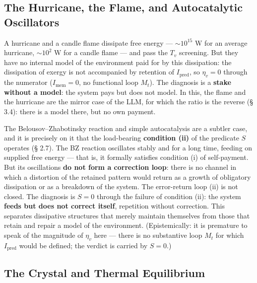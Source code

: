 \documentclass[pdflatex,sn-mathphys-ay]{sn-jnl}
\begin{document}
\subsection{The Hurricane, the Flame, and Autocatalytic Oscillators}\label{the-hurricane-the-flame-and-autocatalytic-oscillators}

A hurricane and a candle flame dissipate free energy --- \(\sim 10^{15}\) W for an average hurricane, \(\sim 10^2\) W for a candle flame --- and pass the \(T_v\) screening. But they have no internal model of the environment paid for by this dissipation: the dissipation of exergy is not accompanied by retention of \(I_{\text{pred}}\), so \(\eta_v = 0\) through the numerator (\(I_{\text{mem}} = 0\), no functional loop \(M_t\)). The diagnosis is a \textbf{stake without a model}: the system pays but does not model. In this, the flame and the hurricane are the mirror case of the LLM, for which the ratio is the reverse (§ 3.4): there is a model there, but no own payment.

The Belousov--Zhabotinsky reaction and simple autocatalysis are a subtler case, and it is precisely on it that the load-bearing \textbf{condition (ii)} of the predicate \(S\) operates (§ 2.7). The BZ reaction oscillates stably and for a long time, feeding on supplied free energy --- that is, it formally satisfies condition (i) of self-payment. But its oscillations \textbf{do not form a correction loop}: there is no channel in which a distortion of the retained pattern would return as a growth of obligatory dissipation or as a breakdown of the system. The error-return loop (ii) is not closed. The diagnosis is \(S = 0\) through the failure of condition (ii): the system \textbf{feeds but does not correct itself}, repetition without correction. This separates dissipative structures that merely maintain themselves from those that retain and repair a model of the environment. (Epistemically: it is premature to speak of the magnitude of \(\eta_v\) here --- there is no substantive loop \(M_t\) for which \(I_{\text{pred}}\) would be defined; the verdict is carried by \(S = 0\).)

\subsection{The Crystal and Thermal Equilibrium}\label{the-crystal-and-thermal-equilibrium}
\end{document}
